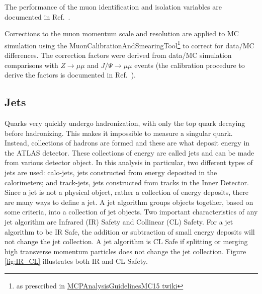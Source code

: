 The performance of the muon identification and isolation variables are documented in Ref.~\cite{Aad:2016jkr}.

Corrections to the muon momentum scale and resolution are applied to MC simulation using the MuonCalibrationAndSmearingTool\footnote{as prescribed 
in \href{https://twiki.cern.ch/twiki/bin/view/AtlasProtected/MCPAnalysisGuidelinesMC15\#Muon_momentum_scale_and_resoluti} {MCPAnalysisGuidelinesMC15 twiki}} 
to correct for  data/MC differences. The correction factors were derived from data/MC 
simulation comparisons with $Z\to \mu \mu$ and $J/\Psi \to \mu \mu$ events (the calibration procedure to derive the factors 
is documented in Ref.~\cite{Aad:2016jkr}).
\subsection{Jets}
Quarks very quickly undergo hadronization, with only the top quark decaying before hadronizing. This makes it impossible to measure a singular quark. Instead, collections of hadrons are formed and these are what deposit energy in the ATLAS detector. These collections of energy are called jets and can be made from various detector object. In this analysis in particular, two different types of jets are used: calo-jets, jets constructed from energy deposited in the calorimeters; and track-jets, jets constructed from tracks in the Inner Detector. \newline
\indent Since a jet is not a physical object, rather a collection of energy deposits, there are many ways to define a jet. A jet algorithm groups objects together, based on some criteria, into a collection of jet objects.   Two important characteristics of any jet algorithm are Infrared (IR) Safety and Collinear (CL) Safety. For a jet algorithm to be IR Safe, the addition or subtraction of small energy deposits will not change the jet collection. A jet algorithm is CL Safe if splitting or merging high transverse momentum particles does not change the jet collection. Figure \ref{fig:IR_CL} illustrates both IR and CL Safety.

